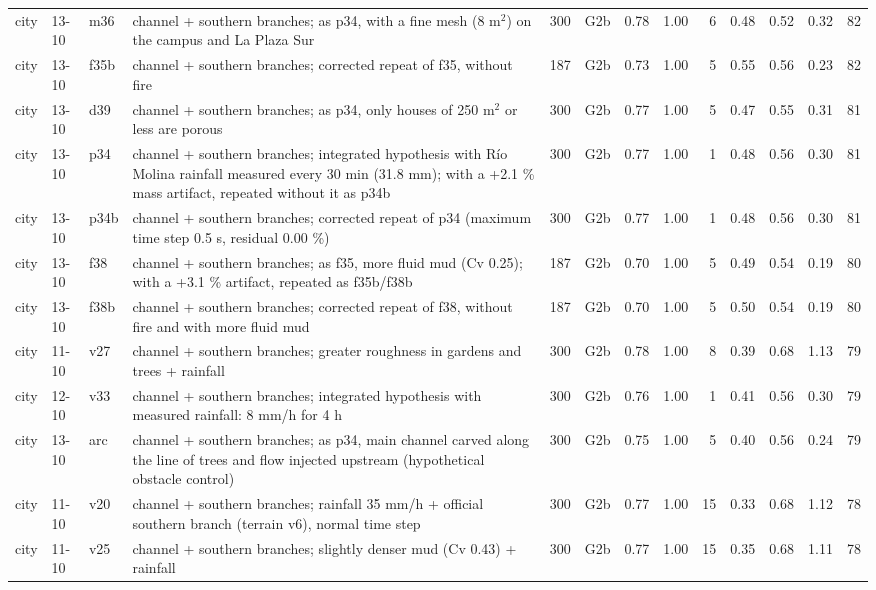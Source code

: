 {\begin{longtable}{lll>{\raggedright\arraybackslash}p{3.3cm}rlrrrrrrr}
city & 13-10 & m36 & channel + southern branches; as p34, with a fine mesh (8 m$^2$) on the campus and La Plaza Sur & 300 & G2b & 0.78 & 1.00 & 6 & 0.48 & 0.52 & 0.32 & 82\\
city & 13-10 & f35b & channel + southern branches; corrected repeat of f35, without fire & 187 & G2b & 0.73 & 1.00 & 5 & 0.55 & 0.56 & 0.23 & 82\\
city & 13-10 & d39 & channel + southern branches; as p34, only houses of 250 m$^2$ or less are porous & 300 & G2b & 0.77 & 1.00 & 5 & 0.47 & 0.55 & 0.31 & 81\\
city & 13-10 & p34 & channel + southern branches; integrated hypothesis with Río Molina rainfall measured every 30 min (31.8 mm); with a +2.1 \% mass artifact, repeated without it as p34b & 300 & G2b & 0.77 & 1.00 & 1 & 0.48 & 0.56 & 0.30 & 81\\
city & 13-10 & p34b & channel + southern branches; corrected repeat of p34 (maximum time step 0.5 s, residual 0.00 \%) & 300 & G2b & 0.77 & 1.00 & 1 & 0.48 & 0.56 & 0.30 & 81\\
city & 13-10 & f38 & channel + southern branches; as f35, more fluid mud (Cv 0.25); with a +3.1 \% artifact, repeated as f35b/f38b & 187 & G2b & 0.70 & 1.00 & 5 & 0.49 & 0.54 & 0.19 & 80\\
city & 13-10 & f38b & channel + southern branches; corrected repeat of f38, without fire and with more fluid mud & 187 & G2b & 0.70 & 1.00 & 5 & 0.50 & 0.54 & 0.19 & 80\\
city & 11-10 & v27 & channel + southern branches; greater roughness in gardens and trees + rainfall & 300 & G2b & 0.78 & 1.00 & 8 & 0.39 & 0.68 & 1.13 & 79\\
city & 12-10 & v33 & channel + southern branches; integrated hypothesis with measured rainfall: 8 mm/h for 4 h & 300 & G2b & 0.76 & 1.00 & 1 & 0.41 & 0.56 & 0.30 & 79\\
city & 13-10 & arc & channel + southern branches; as p34, main channel carved along the line of trees and flow injected upstream (hypothetical obstacle control) & 300 & G2b & 0.75 & 1.00 & 5 & 0.40 & 0.56 & 0.24 & 79\\
city & 11-10 & v20 & channel + southern branches; rainfall 35 mm/h + official southern branch (terrain v6), normal time step & 300 & G2b & 0.77 & 1.00 & 15 & 0.33 & 0.68 & 1.12 & 78\\
city & 11-10 & v25 & channel + southern branches; slightly denser mud (Cv 0.43) + rainfall & 300 & G2b & 0.77 & 1.00 & 15 & 0.35 & 0.68 & 1.11 & 78\\

\end{longtable}}
